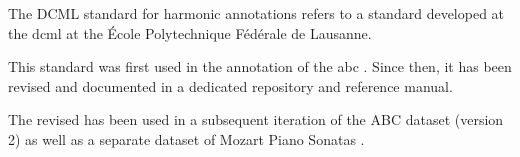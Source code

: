 

The DCML standard for harmonic annotations refers to a
standard developed at the \gls{dcml} at the \'Ecole
Polytechnique F\'ed\'erale de Lausanne.

This standard was first used in the annotation of the
\gls{abc}
\parencite{neuwirth2018annotated}. Since then, it has been
revised and documented in a dedicated
repository
and reference
manual.

The revised has been used in a subsequent iteration of the
ABC dataset (version 2) as well as a separate dataset of
Mozart Piano Sonatas \parencite{hentschel2021annotated}.
